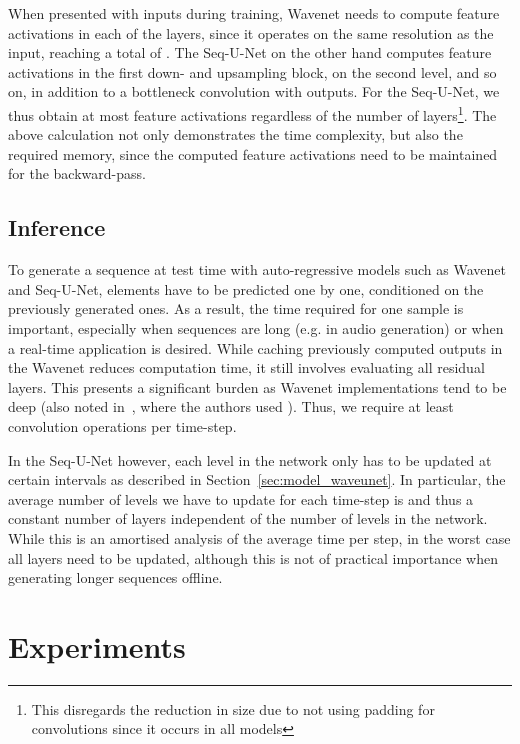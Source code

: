 \documentclass{article}
\begin{document}
When presented with  inputs during training, Wavenet needs to compute  feature activations in each of the  layers, since it operates on the same resolution as the input, reaching a total of . 
The Seq-U-Net on the other hand computes  feature activations in the first down- and upsampling block,  on the second level, and so on, in addition to a bottleneck convolution with  outputs.
For the Seq-U-Net, we thus obtain at most  feature activations regardless of the number of layers\footnote{This disregards the reduction in size due to not using padding for convolutions since it occurs in all models}.
The above calculation not only demonstrates the time complexity, but also the required memory, since the computed feature activations need to be maintained for the backward-pass.

\subsection{Inference}
\label{sec:complexity_inference}

To generate a sequence at test time with auto-regressive models such as Wavenet and Seq-U-Net, elements have to be predicted one by one, conditioned on the previously generated ones. 
As a result, the time required for one sample is important, especially when sequences are long (e.g. in audio generation) or when a real-time application is desired.
While caching previously computed outputs in the Wavenet reduces computation time, it still involves evaluating all  residual layers.
This presents a significant burden as Wavenet implementations tend to be deep (also noted in~\cite{kalchbrennerEfficientNeural2018}, where the authors used ).
Thus, we require at least  convolution operations per time-step.

In the Seq-U-Net however, each level in the network only has to be updated at certain intervals as described in Section~\ref{sec:model_waveunet}.
In particular, the average number of levels we have to update for each time-step is  and thus a constant number of layers independent of the number of levels  in the network.
While this is an amortised analysis of the average time per step, in the worst case all layers need to be updated, although this is not of practical importance when generating longer sequences offline.

\section{Experiments}
\end{document}

